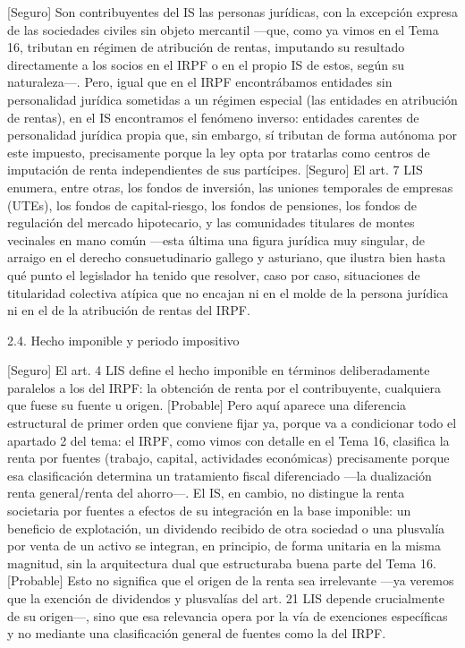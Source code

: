 \documentclass[10pt,a4paper]{article}
\begin{document}
[Seguro] Son contribuyentes del IS las personas jurídicas, con la excepción expresa de las sociedades civiles sin objeto mercantil —que, como ya vimos en el Tema 16, tributan en régimen de atribución de rentas, imputando su resultado directamente a los socios en el IRPF o en el propio IS de estos, según su naturaleza—. Pero, igual que en el IRPF encontrábamos entidades sin personalidad jurídica sometidas a un régimen especial (las entidades en atribución de rentas), en el IS encontramos el fenómeno inverso: entidades carentes de personalidad jurídica propia que, sin embargo, sí tributan de forma autónoma por este impuesto, precisamente porque la ley opta por tratarlas como centros de imputación de renta independientes de sus partícipes. [Seguro] El art. 7 LIS enumera, entre otras, los fondos de inversión, las uniones temporales de empresas (UTEs), los fondos de capital-riesgo, los fondos de pensiones, los fondos de regulación del mercado hipotecario, y las comunidades titulares de montes vecinales en mano común —esta última una figura jurídica muy singular, de arraigo en el derecho consuetudinario gallego y asturiano, que ilustra bien hasta qué punto el legislador ha tenido que resolver, caso por caso, situaciones de titularidad colectiva atípica que no encajan ni en el molde de la persona jurídica ni en el de la atribución de rentas del IRPF.

2.4. Hecho imponible y periodo impositivo

[Seguro] El art. 4 LIS define el hecho imponible en términos deliberadamente paralelos a los del IRPF: la obtención de renta por el contribuyente, cualquiera que fuese su fuente u origen. [Probable] Pero aquí aparece una diferencia estructural de primer orden que conviene fijar ya, porque va a condicionar todo el apartado 2 del tema: el IRPF, como vimos con detalle en el Tema 16, clasifica la renta por fuentes (trabajo, capital, actividades económicas) precisamente porque esa clasificación determina un tratamiento fiscal diferenciado —la dualización renta general/renta del ahorro—. El IS, en cambio, no distingue la renta societaria por fuentes a efectos de su integración en la base imponible: un beneficio de explotación, un dividendo recibido de otra sociedad o una plusvalía por venta de un activo se integran, en principio, de forma unitaria en la misma magnitud, sin la arquitectura dual que estructuraba buena parte del Tema 16. [Probable] Esto no significa que el origen de la renta sea irrelevante —ya veremos que la exención de dividendos y plusvalías del art. 21 LIS depende crucialmente de su origen—, sino que esa relevancia opera por la vía de exenciones específicas y no mediante una clasificación general de fuentes como la del IRPF.
\end{document}
